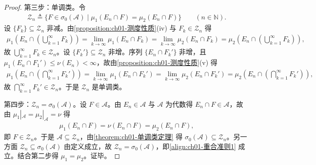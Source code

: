 \documentclass[../../main.tex]{subfiles}%
\begin{document}
\begin{proof}
第三步：单调类。令
\begin{align*}
\mathcal{Z}_n\triangleq\{F\in\sigma_0(\mathcal{A})\mid\mu_1(E_n\cap F)=\mu_2(E_n\cap F)\}\qquad(n\in\mathbb{N}).
\end{align*}
设 $\{F_k\}\subseteq\mathcal{Z}_n$ 非减。由\cref{proposition:ch01-测度性质}(iv) 与 $F_k\in\mathcal{Z}_n$ 得
\begin{align*}
\mu_1\left(E_n\cap\left(\bigcup_{k=1}^\infty F_k\right)\right)=\lim_{k\to\infty}\mu_1(E_n\cap F_k)=\lim_{k\to\infty}\mu_2(E_n\cap F_k)=\mu_2\left(E_n\cap\left(\bigcup_{k=1}^\infty F_k\right)\right),
\end{align*}
故 $\bigcup_{k=1}^\infty F_k\in\mathcal{Z}_n$。设 $\{F_k'\}\subseteq\mathcal{Z}_n$ 非增。序列 $\{E_n\cap F_k'\}$ 非增，且 $\mu_1(E_n\cap F_1')\leqslant\nu(E_n)<\infty$，故由\cref{proposition:ch01-测度性质}(v) 得
\begin{align*}
\mu_1\left(E_n\cap\left(\bigcap_{k=1}^\infty F_k'\right)\right)=\lim_{k\to\infty}\mu_1(E_n\cap F_k')=\lim_{k\to\infty}\mu_2(E_n\cap F_k')=\mu_2\left(E_n\cap\left(\bigcap_{k=1}^\infty F_k'\right)\right),
\end{align*}
故 $\bigcap_{k=1}^\infty F_k'\in\mathcal{Z}_n$。于是 $\mathcal{Z}_n$ 是单调类。

第四步：$\mathcal{Z}_n=\sigma_0(\mathcal{A})$。设 $F\in\mathcal{A}$。由 $E_n\in\mathcal{A}$ 与 $\mathcal{A}$ 为代数得 $E_n\cap F\in\mathcal{A}$，故由 $\mu_1|_{\mathcal{A}}=\mu_2|_{\mathcal{A}}=\nu$ 得
\begin{align*}
\mu_1(E_n\cap F)=\nu(E_n\cap F)=\mu_2(E_n\cap F),
\end{align*}
即 $F\in\mathcal{Z}_n$。于是 $\mathcal{A}\subseteq\mathcal{Z}_n$，由\cref{theorem:ch01-单调类定理} 得 $\sigma_0(\mathcal{A})\subseteq\mathcal{Z}_n$。另一方面 $\mathcal{Z}_n\subseteq\sigma_0(\mathcal{A})$ 由定义成立，故 $\mathcal{Z}_n=\sigma_0(\mathcal{A})$，即\eqref{align:ch01-重合准则1} 成立。结合第二步得 $\mu_1=\mu_2$。证毕。
\end{proof}
\end{document}
